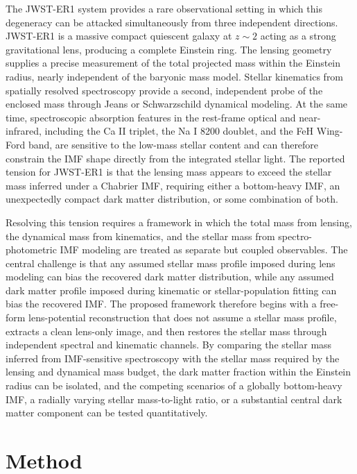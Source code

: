 \documentclass{article}
\begin{document}
The JWST-ER1 system provides a rare observational setting in which this degeneracy can be attacked simultaneously from three independent directions. JWST-ER1 is a massive compact quiescent galaxy at $z\sim2$ acting as a strong gravitational lens, producing a complete Einstein ring. The lensing geometry supplies a precise measurement of the total projected mass within the Einstein radius, nearly independent of the baryonic mass model. Stellar kinematics from spatially resolved spectroscopy provide a second, independent probe of the enclosed mass through Jeans or Schwarzschild dynamical modeling. At the same time, spectroscopic absorption features in the rest-frame optical and near-infrared, including the Ca II triplet, the Na I 8200 doublet, and the FeH Wing-Ford band, are sensitive to the low-mass stellar content and can therefore constrain the IMF shape directly from the integrated stellar light. The reported tension for JWST-ER1 is that the lensing mass appears to exceed the stellar mass inferred under a Chabrier IMF, requiring either a bottom-heavy IMF, an unexpectedly compact dark matter distribution, or some combination of both.

Resolving this tension requires a framework in which the total mass from lensing, the dynamical mass from kinematics, and the stellar mass from spectro-photometric IMF modeling are treated as separate but coupled observables. The central challenge is that any assumed stellar mass profile imposed during lens modeling can bias the recovered dark matter distribution, while any assumed dark matter profile imposed during kinematic or stellar-population fitting can bias the recovered IMF. The proposed framework therefore begins with a free-form lens-potential reconstruction that does not assume a stellar mass profile, extracts a clean lens-only image, and then restores the stellar mass through independent spectral and kinematic channels. By comparing the stellar mass inferred from IMF-sensitive spectroscopy with the stellar mass required by the lensing and dynamical mass budget, the dark matter fraction within the Einstein radius can be isolated, and the competing scenarios of a globally bottom-heavy IMF, a radially varying stellar mass-to-light ratio, or a substantial central dark matter component can be tested quantitatively.

\section{Method}
\end{document}
